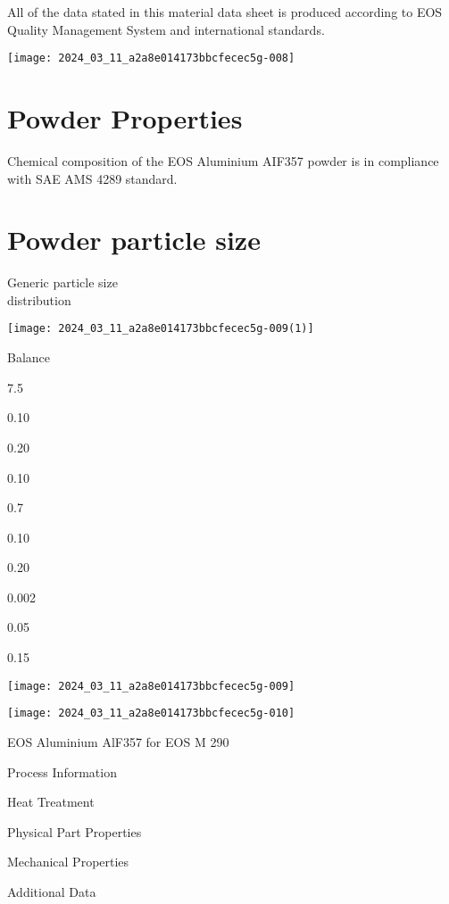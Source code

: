 \documentclass[10pt]{article}
\begin{document}
All of the data stated in this material data sheet is produced according to EOS Quality Management System and international standards.

\begin{center}
\texttt{[image: 2024\_03\_11\_a2a8e014173bbcfecec5g-008]}
\end{center}

\section*{Powder Properties}
Chemical composition of the EOS Aluminium AIF357 powder is in compliance with SAE AMS 4289 standard.

\section*{Powder particle size}
Generic particle size\\
distribution

\begin{center}
\texttt{[image: 2024\_03\_11\_a2a8e014173bbcfecec5g-009(1)]}
\end{center}

Balance

7.5

0.10

0.20

0.10

0.7

0.10

0.20

0.002

0.05

0.15

\begin{center}
\texttt{[image: 2024\_03\_11\_a2a8e014173bbcfecec5g-009]}
\end{center}

\begin{center}
\texttt{[image: 2024\_03\_11\_a2a8e014173bbcfecec5g-010]}
\end{center}

EOS Aluminium AlF357 for EOS M 290

Process Information

Heat Treatment

Physical Part Properties

Mechanical Properties

Additional Data
\end{document}
